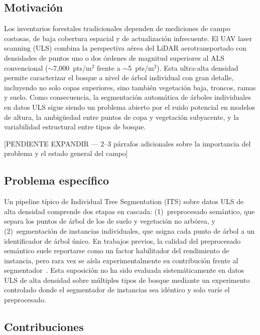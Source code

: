 \documentclass[runningheads]{llncs}
\begin{document}
\subsection{Motivaci\'on}

Los inventarios forestales tradicionales dependen de mediciones de campo costosas, de baja cobertura espacial y de actualizaci\'on infrecuente. El UAV laser scanning (ULS) combina la perspectiva a\'erea del LiDAR aerotransportado con densidades de puntos uno o dos \'ordenes de magnitud superiores al ALS convencional ($\sim$7{,}000~pts/m$^2$ frente a $\sim$5~pts/m$^2$). Esta ultra-alta densidad permite caracterizar el bosque a nivel de \'arbol individual con gran detalle, incluyendo no solo copas superiores, sino tambi\'en vegetaci\'on baja, troncos, ramas y suelo. Como consecuencia, la segmentaci\'on autom\'atica de \'arboles individuales en datos ULS sigue siendo un problema abierto por el ruido potencial en modelos de altura, la ambig\"uedad entre puntos de copa y vegetaci\'on subyacente, y la variabilidad estructural entre tipos de bosque.

[PENDIENTE EXPANDIR --- 2--3 p\'arrafos adicionales sobre la importancia del problema y el estado general del campo]

\subsection{Problema espec\'ifico}

Un pipeline t\'ipico de Individual Tree Segmentation (ITS) sobre datos ULS de alta densidad comprende dos etapas en cascada: (1)~preprocesado sem\'antico, que separa los puntos de \'arbol de los de suelo y vegetaci\'on no arb\'orea, y (2)~segmentaci\'on de instancias individuales, que asigna cada punto de \'arbol a un identificador de \'arbol \'unico. En trabajos previos, la calidad del preprocesado sem\'antico suele reportarse como un factor habilitador del rendimiento de instancia, pero rara vez se a\'isla experimentalmente su contribuci\'on frente al segmentador~\cite{qi2017,breiman2001,puliti2023}.
Esta suposici\'on no ha sido evaluada sistem\'aticamente en datos ULS de alta densidad sobre m\'ultiples tipos de bosque mediante un experimento controlado donde el segmentador de instancias sea id\'entico y solo var\'ie el preprocesado.

\subsection{Contribuciones}
\end{document}
